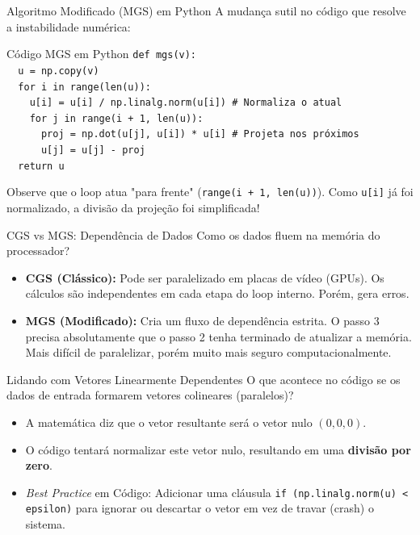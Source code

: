 \documentclass{beamer}
\begin{document}
\begin{frame}{Algoritmo Modificado (MGS) em Python}
A mudança sutil no código que resolve a instabilidade numérica:
\vspace{0.3cm}
\begin{block}{Código MGS em Python}
\texttt{def mgs(v):}\\
\texttt{\ \ u = np.copy(v)}\\
\texttt{\ \ for i in range(len(u)):}\\
\texttt{\ \ \ \ u[i] = u[i] / np.linalg.norm(u[i]) \# Normaliza o atual}\\
\texttt{\ \ \ \ for j in range(i + 1, len(u)):}\\
\texttt{\ \ \ \ \ \ proj = np.dot(u[j], u[i]) * u[i] \# Projeta nos próximos}\\
\texttt{\ \ \ \ \ \ u[j] = u[j] - proj}\\
\texttt{\ \ return u}
\end{block}
\vspace{0.3cm}
Observe que o loop atua "para frente" (\texttt{range(i + 1, len(u))}). Como \texttt{u[i]} já foi normalizado, a divisão da projeção foi simplificada!
\end{frame}

\begin{frame}{CGS vs MGS: Dependência de Dados}
Como os dados fluem na memória do processador?
\begin{itemize}
    \item \textbf{CGS (Clássico):} Pode ser paralelizado em placas de vídeo (GPUs). Os cálculos são independentes em cada etapa do loop interno. Porém, gera erros.
    \item \textbf{MGS (Modificado):} Cria um fluxo de dependência estrita. O passo 3 precisa absolutamente que o passo 2 tenha terminado de atualizar a memória. Mais difícil de paralelizar, porém muito mais seguro computacionalmente.
\end{itemize}
\end{frame}

\begin{frame}{Lidando com Vetores Linearmente Dependentes}
O que acontece no código se os dados de entrada formarem vetores colineares (paralelos)?
\begin{itemize}
    \item A matemática diz que o vetor resultante será o vetor nulo $(0,0,0)$.
    \item O código tentará normalizar este vetor nulo, resultando em uma \textbf{divisão por zero}.
    \item \textit{Best Practice} em Código: Adicionar uma cláusula \texttt{if (np.linalg.norm(u) < epsilon)} para ignorar ou descartar o vetor em vez de travar (crash) o sistema.
\end{itemize}
\end{frame}
\end{document}
